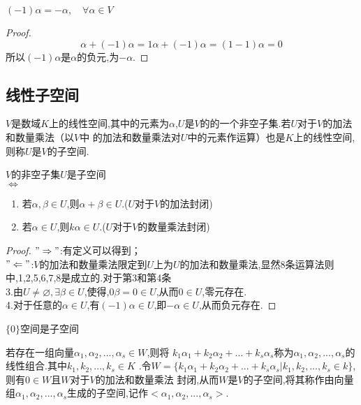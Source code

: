 \documentclass[blue,normal,cn]{elegantnote}
\begin{document}
\begin{property}
    $(-1)α=-α,\quad \forall α ∈ V$
 \end{property}
 
 \begin{proof}
     \begin{equation*}
         α+(-1)α=1α+(-1)α=(1-1)α=0
     \end{equation*}
     所以$(-1)α$是$α$的负元,为$-α$.
 \end{proof}

\subsection{线性子空间}
\begin{definition}
$V$是数域$K$上的线性空间,其中的元素为$α$,$U$是$V$的的一个非空子集.若$U$对于$V$的加法和数量乘法（以$V$中
的加法和数量乘法对$U$中的元素作运算）也是$K$上的线性空间,
则称$U$是$V$的子空间.
\end{definition}

\begin{theorem}
$V$的非空子集$U$是子空间 \\
$\Longleftrightarrow$
    \begin{enumerate}
        \item 若$α,β ∈ U$,则$α+β ∈ U$.($U$对于$V$的加法封闭)
        \item 若$α ∈ U$,则$kα ∈ U$.($U$对于$V$的数量乘法封闭)
    \end{enumerate}
\end{theorem}

\begin{proof}
$"\Rightarrow"$:有定义可以得到；\\
$"\Leftarrow"$:$V$的加法和数量乘法限定到$U$上为$U$的加法和数量乘法,显然8条运算法则中,1,2,5,6,7,8是成立的.对于第3和第4条
\\3.由$U≠ \varnothing,\exists β ∈ U$,使得,$0β=0 ∈ U$,从而$0 ∈ U$,零元存在.\\
4.对于任意的$α ∈ U$,有$(-1)α ∈ U$,即$-α ∈ U$,从而负元存在.
\end{proof}

\begin{example}
$\{0\}$空间是子空间
\end{example}

\begin{definition}
若存在一组向量$α_1,α_2,...,α_s ∈ W$,则将
$k_1 α_1+k_2 α_2+...+k_s α_s$称为$α_1,α_2,...,α_s$的线性组合.其中$k_1,k_2,...,k_s ∈ K$
.令$W=\{k_1 α_1+k_2 α_2+...+k_s α_s|k_1,k_2,...,k_s ∈ k\}$,则有$0 ∈ W$且$W$对于$V$的加法和数量乘法
封闭,从而$W$是$V$的子空间,将其称作由向量组$α_1,α_2,...,α_s$生成的子空间,记作$<α_1,α_2,...,α_s>$.
\end{definition}
\end{document}
